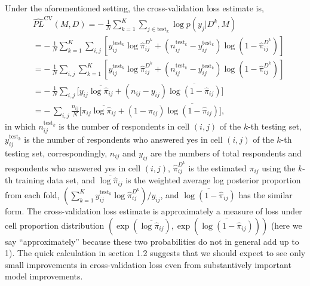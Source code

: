 \documentclass[sii]{ipart}
\begin{document}
Under the aforementioned setting, the cross-validation loss estimate is,
\begin{align*}
  \label{eq:CV4MultiWaySurvey}
  &\widehat{PL}^{\text{CV}}(M, D) =-\,\frac{1}{N}\sum_{k=1}^K\sum_{j\in \text{test}_k}\log p(y_j|D^k, M)\\
  & = -\,\frac{1}{N}\sum_{k=1}^K\sum_{i,j} [y^{\text{test}_k}_{ij}\log\hat\pi_{ij}^{D^k}+(n^{\text{test}_k}_{ij}- y^{\text{test}_k}_{ij})\log(1-\hat\pi_{ij}^{D^k})]\\
  & = -\,\frac{1}{N}\sum_{i,j}\sum_{k=1}^K[ y^{\text{test}_k}_{ij}\log\hat\pi_{ij}^{D^k}+(n^{\text{test}_k}_{ij}- y^{\text{test}_k}_{ij})\log(1-\hat\pi_{ij}^{D^k})]\\
  & = -\,\frac{1}{N}\sum_{i,j}\big[y_{ij}\overline{\log\hat{\pi}_{ij}} +(n_{ij}- y_{ij})\overline{\log(1-\hat\pi_{ij})}\big]\\
  & = -\,\sum_{i,j}\frac{n_{ij}}{N}\big[\pi_{ij}\overline{\log\hat\pi_{ij}} +(1- \pi_{ij})\overline{\log(1-\hat\pi_{ij})}\big],
\end{align*}
in which $n_{ij}^{\text{test}_k}$ is the number of respondents in cell $(i,j)$ of
the $k$-th testing set, $y_{ij}^{\text{test}_k}$ is the number of respondents who
answered yes in cell $(i,j)$ of the $k$-th testing set, correspondingly, $n_{ij}$
and $y_{ij}$ are the numbers of total respondents and respondents who answered
yes in cell $(i,j)$, $\hat\pi_{ij}^{D^k}$ is the estimated $\pi_{ij}$ using the
$k$-th training data set, and $\overline{\log\hat\pi_{ij}}$ is the weighted
average log posterior proportion from each fold,
$\left(\sum_{k=1}^Ky^{\text{test}_k}_{ij}\log\hat\pi_{ij}^{D^k}
\right)\big/y_{ij}$, and $\overline{\log(1-\hat\pi_{ij})}$ has the similar
form. The cross-validation loss estimate is approximately a measure of loss under
cell proportion distribution $(\exp(\overline{\log\hat\pi_{ij}}),
\exp(\overline{\log(1-\hat\pi_{ij})}))$ (here we say ``approximately'' because
these two probabilities do not in general add up to 1). The quick calculation in
section 1.2 suggests that we should expect to see only small improvements in
cross-validation loss even from substantively important model improvements.
\end{document}
